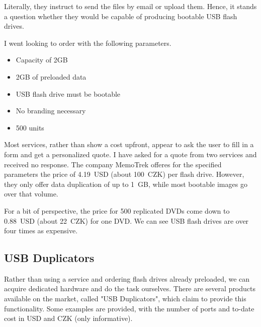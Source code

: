             Literally, they instruct to send the files by email or upload them.  Hence, it stands a question whether they would be capable of producing bootable USB flash drives.
            
            I went looking to order with the following parameters.
            \begin{itemize}
                \item Capacity of 2GB
                \item 2GB of preloaded data
                \item USB flash drive must be bootable
                \item No branding necessary
                \item 500 units
            \end{itemize}
            
            Most services, rather than show a cost upfront, appear to ask the user to fill in a form and get a personalized quote\cite{memorysuppliers}\cite{flashbay}\cite{premiumusb}.  I have asked for a quote from two services and received no response.  The company MemoTrek offeres for the specified parameters the price of 4.19~USD (about 100~CZK) per flash drive\cite{memotrek-clip-n-easy}.  However, they only offer data duplication of up to 1~GB, while most bootable images go over that volume.
            
            For a bit of perspective, the price for 500 replicated DVDs come down to 0.88~USD (about 22~CZK) for one DVD\cite{discmakers-quoter}.  We can see USB flash drives are over four times as expensive.
        
        \subsection{USB Duplicators}
            Rather than using a service and ordering flash drives already preloaded, we can acquire dedicated hardware and do the task ourselves.  There are several products available on the market, called "USB Duplicators", which claim to provide this functionality.  Some examples are provided, with the number of ports and to-date cost in USD and CZK (only informative).
            
